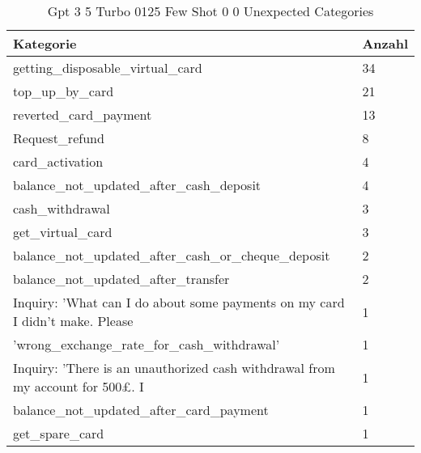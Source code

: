 
    \begin{table}[!ht]
        \centering
        \begin{tabularx}{\textwidth}{X X}
\toprule
\textbf{Kategorie} & \textbf{Anzahl} \\
\midrule
getting\_disposable\_virtual\_card & \num{34} \\
top\_up\_by\_card & \num{21} \\
reverted\_card\_payment & \num{13} \\
Request\_refund & \num{8} \\
card\_activation & \num{4} \\
balance\_not\_updated\_after\_cash\_deposit & \num{4} \\
cash\_withdrawal & \num{3} \\
get\_virtual\_card & \num{3} \\
balance\_not\_updated\_after\_cash\_or\_cheque\_deposit & \num{2} \\
balance\_not\_updated\_after\_transfer & \num{2} \\
Inquiry: 'What can I do about some payments on my card I didn't make. Please & \num{1} \\
'wrong\_exchange\_rate\_for\_cash\_withdrawal' & \num{1} \\
Inquiry: 'There is an unauthorized cash withdrawal from my account for 500£.  I & \num{1} \\
balance\_not\_updated\_after\_card\_payment & \num{1} \\
get\_spare\_card & \num{1} \\
\bottomrule
\end{tabularx}

        \caption{Gpt 3 5 Turbo 0125 Few Shot 0 0 Unexpected Categories}
        \label{tab:gpt-3-5-turbo-0125-few-shot-0-0-unexpected-categories}
    \end{table}
    